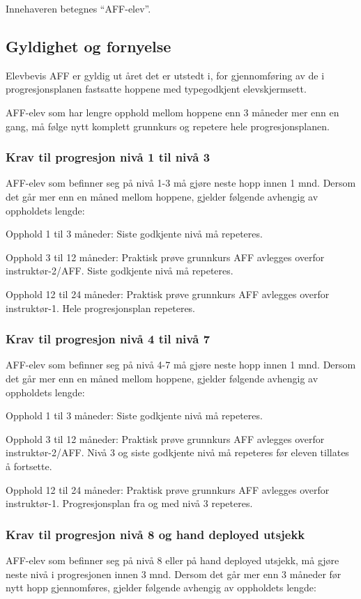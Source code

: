 Innehaveren betegnes ``AFF-elev''.

\subsection{Gyldighet og fornyelse}
Elevbevis AFF er gyldig ut året det er utstedt i, for gjennomføring av de i progresjonsplanen fastsatte hoppene med typegodkjent elevskjermsett.

AFF-elev som har lengre opphold mellom hoppene enn 3 måneder mer enn en gang, må følge nytt komplett grunnkurs og repetere hele progresjonsplanen.

\subsubsection{Krav til progresjon nivå 1 til nivå 3}
AFF-elev som befinner seg på nivå 1-3 må gjøre neste hopp innen 1 mnd. Dersom det går mer enn en måned mellom hoppene, gjelder følgende avhengig av oppholdets lengde:

Opphold 1 til 3 måneder: Siste godkjente nivå må repeteres.

Opphold 3 til 12 måneder: Praktisk prøve grunnkurs AFF avlegges overfor instruktør-2/AFF. Siste godkjente nivå må repeteres.

Opphold 12 til 24 måneder: Praktisk prøve grunnkurs AFF avlegges overfor instruktør-1. Hele progresjonsplan repeteres.

\subsubsection{Krav til progresjon nivå 4 til nivå 7}
AFF-elev som befinner seg på nivå 4-7 må gjøre neste hopp innen 1 mnd. Dersom det går mer enn en måned mellom hoppene, gjelder følgende avhengig av oppholdets lengde:

Opphold 1 til 3 måneder: Siste godkjente nivå må repeteres.

Opphold 3 til 12 måneder: Praktisk prøve grunnkurs AFF avlegges overfor instruktør-2/AFF. Nivå 3 og siste godkjente nivå må repeteres før eleven tillates å fortsette.

Opphold 12 til 24 måneder: Praktisk prøve grunnkurs AFF avlegges overfor instruktør-1. Progresjonsplan fra og med nivå 3 repeteres.

\subsubsection{Krav til progresjon nivå 8 og hand deployed utsjekk}
AFF-elev som befinner seg på nivå 8 eller på hand deployed utsjekk, må gjøre neste nivå i progresjonen innen 3 mnd. Dersom det går mer enn 3 måneder før nytt hopp gjennomføres, gjelder følgende avhengig av oppholdets lengde:

